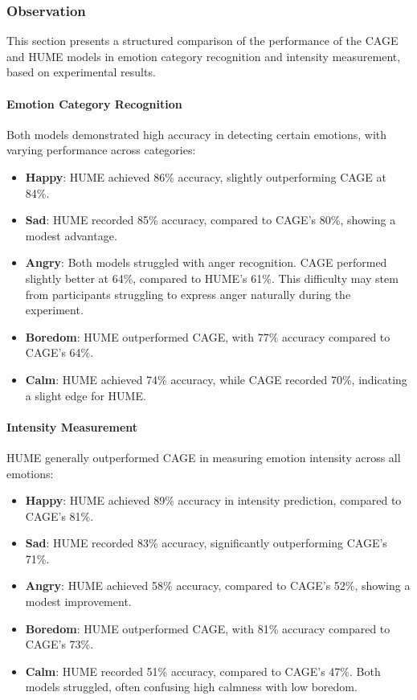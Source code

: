 \subsubsection*{Observation}

This section presents a structured comparison of the performance of the CAGE and HUME models in emotion category recognition and intensity measurement, based on experimental results.

\paragraph*{Emotion Category Recognition}
Both models demonstrated high accuracy in detecting certain emotions, with varying performance across categories:
\begin{itemize}
    \item \textbf{Happy}: HUME achieved 86\% accuracy, slightly outperforming CAGE at 84\%.
    \item \textbf{Sad}: HUME recorded 85\% accuracy, compared to CAGE’s 80\%, showing a modest advantage.
    \item \textbf{Angry}: Both models struggled with anger recognition. CAGE performed slightly better at 64\%, compared to HUME’s 61\%. This difficulty may stem from participants struggling to express anger naturally during the experiment.
    \item \textbf{Boredom}: HUME outperformed CAGE, with 77\% accuracy compared to CAGE’s 64\%.
    \item \textbf{Calm}: HUME achieved 74\% accuracy, while CAGE recorded 70\%, indicating a slight edge for HUME.
\end{itemize}

\paragraph*{Intensity Measurement}
HUME generally outperformed CAGE in measuring emotion intensity across all emotions:
\begin{itemize}
    \item \textbf{Happy}: HUME achieved 89\% accuracy in intensity prediction, compared to CAGE’s 81\%.
    \item \textbf{Sad}: HUME recorded 83\% accuracy, significantly outperforming CAGE’s 71\%.
    \item \textbf{Angry}: HUME achieved 58\% accuracy, compared to CAGE’s 52\%, showing a modest improvement.
    \item \textbf{Boredom}: HUME outperformed CAGE, with 81\% accuracy compared to CAGE’s 73\%.
    \item \textbf{Calm}: HUME recorded 51\% accuracy, compared to CAGE’s 47\%. Both models struggled, often confusing high calmness with low boredom.
\end{itemize}

